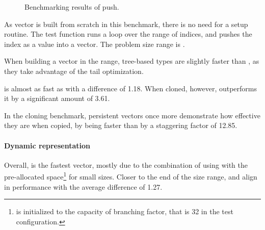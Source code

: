 \begin{figure}[!htbp]
\begin{adjustbox}{width=\textwidth}
    \end{adjustbox}

    \caption{Benchmarking results of push.}
    \label{fig:push}
\end{figure}

As vector is built from scratch in this benchmark, there is no need for a setup routine. The test function runs a loop over the \range{[0, N)} range of indices, and pushes the index as a value into a vector. The problem size range is \range{[20, \mega{1}]}.

When building a vector in the \range{[20, 100]} range, tree-based types are slightly faster than \stdvec{}, as they take advantage of the tail optimization.

\imrsvec{} is almost as fast as \rbvec{} with a difference of 1.18. When cloned, however, \rbvec{} outperforms it by a significant amount of 3.61.

In the cloning benchmark, persistent vectors once more demonstrate how effective they are when copied, by \rbvec{} being faster than \stdvec{} by a staggering factor of 12.85.

\paragraph{Dynamic representation}
Overall, \pvec{} is the fastest vector, mostly due to the combination of using \stdvec{} with the pre-allocated space\footnote{\pvec{} is initialized to the capacity of branching factor, that is 32 in the test configuration.} for small sizes. Closer to the end of the size range, \stdvec{} and \pvec{} align in performance with the average difference of 1.27.

